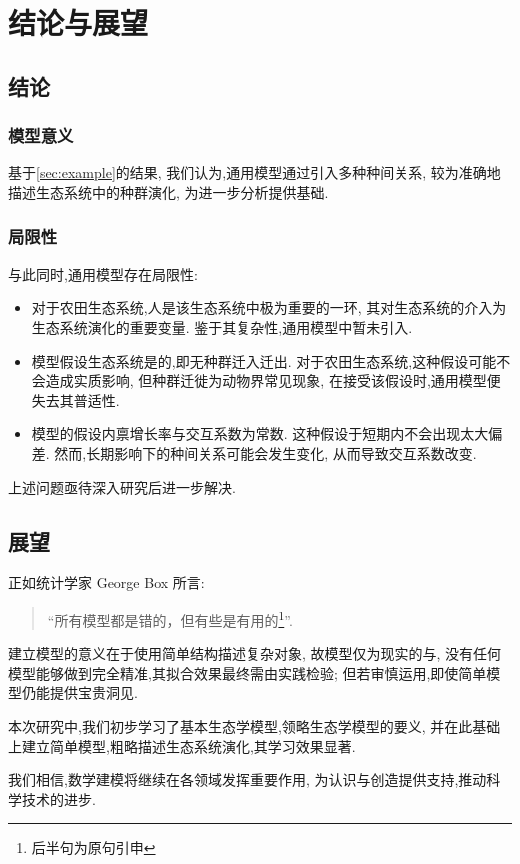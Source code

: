 \documentclass[a4paper, twocolumn]{ctexart}
\begin{document}
\section{结论与展望}

\subsection{结论}

\subsubsection{模型意义}
基于\cref{sec:example}的结果,
我们认为,通用模型通过引入多种种间关系,
较为准确地描述生态系统中的种群演化,
为进一步分析提供基础.

\subsubsection{局限性}
与此同时,通用模型存在局限性:
\begin{itemize}
    \item {}\space
        对于农田生态系统,人是该生态系统中极为重要的一环,
        其对生态系统的介入为生态系统演化的重要变量.
        鉴于其复杂性,通用模型中暂未引入.
    \item {}\space
        模型假设生态系统是的,即无种群迁入迁出.
        对于农田生态系统,这种假设可能不会造成实质影响,
        但种群迁徙为动物界常见现象,
        在接受该假设时,通用模型便失去其普适性.
    \item {}\space
        模型的假设内禀增长率与交互系数为常数.
        这种假设于短期内不会出现太大偏差.
        然而,长期影响下的种间关系可能会发生变化,
        从而导致交互系数改变.
\end{itemize}
上述问题亟待深入研究后进一步解决.

\subsection{展望}
正如统计学家 George Box 所言\autocite{box-statistics}:
\begin{quote}
    “所有模型都是错的，但有些是有用的\footnote{后半句为原句引申}”.
\end{quote}
建立模型的意义在于使用简单结构描述复杂对象,
故模型仅为现实的与,
没有任何模型能够做到完全精准,其拟合效果最终需由实践检验;
但若审慎运用,即使简单模型仍能提供宝贵洞见.

本次研究中,我们初步学习了基本生态学模型,领略生态学模型的要义,
并在此基础上建立简单模型,粗略描述生态系统演化,其学习效果显著.

我们相信,数学建模将继续在各领域发挥重要作用,
为认识与创造提供支持,推动科学技术的进步.

\printbibliography[title=参考文献]
\end{document}
